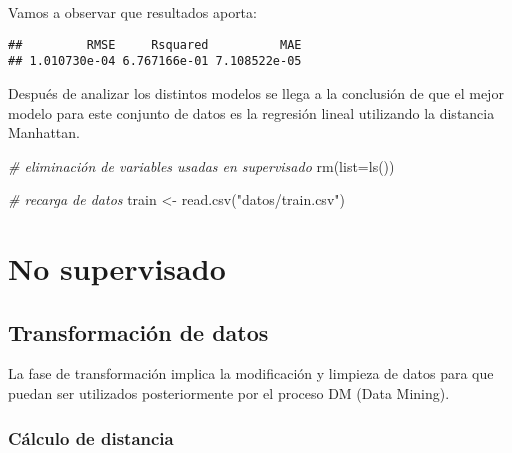 \documentclass[
]{article}
\newenvironment{Shaded}{\begin{snugshade}}{\end{snugshade}}
\newcommand{\AttributeTok}[1]{\textcolor[rgb]{0.77,0.63,0.00}{#1}}
\newcommand{\CommentTok}[1]{\textcolor[rgb]{0.56,0.35,0.01}{\textit{#1}}}
\newcommand{\FunctionTok}[1]{\textcolor[rgb]{0.00,0.00,0.00}{#1}}
\newcommand{\NormalTok}[1]{#1}
\newcommand{\OtherTok}[1]{\textcolor[rgb]{0.56,0.35,0.01}{#1}}
\newcommand{\SpecialCharTok}[1]{\textcolor[rgb]{0.00,0.00,0.00}{#1}}
\newcommand{\StringTok}[1]{\textcolor[rgb]{0.31,0.60,0.02}{#1}}
\begin{document}
Vamos a observar que resultados aporta:

\begin{Shaded}
\end{Shaded}

\begin{verbatim}
##         RMSE     Rsquared          MAE 
## 1.010730e-04 6.767166e-01 7.108522e-05
\end{verbatim}

Después de analizar los distintos modelos se llega a la conclusión de
que el mejor modelo para este conjunto de datos es la regresión lineal
utilizando la distancia Manhattan.

\begin{Shaded}
\begin{Highlighting}[]
\CommentTok{\# eliminación de variables usadas en supervisado}
\FunctionTok{rm}\NormalTok{(}\AttributeTok{list=}\FunctionTok{ls}\NormalTok{())}

\CommentTok{\# recarga de datos}
\NormalTok{train }\OtherTok{\textless{}{-}} \FunctionTok{read.csv}\NormalTok{(}\StringTok{"datos/train.csv"}\NormalTok{)}
\end{Highlighting}
\end{Shaded}

\hypertarget{no-supervisado}{%
\section{No supervisado}\label{no-supervisado}}

\hypertarget{transformaciuxf3n-de-datos}{%
\subsection{Transformación de datos}\label{transformaciuxf3n-de-datos}}

La fase de transformación implica la modificación y limpieza de datos
para que puedan ser utilizados posteriormente por el proceso DM (Data
Mining).

\hypertarget{cuxe1lculo-de-distancia}{%
\subsubsection{Cálculo de distancia}\label{cuxe1lculo-de-distancia}}
\end{document}
